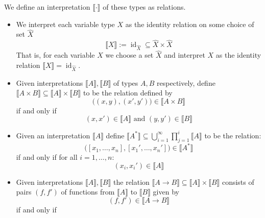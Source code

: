 \documentclass[12pt]{article}
\theoremstyle{plain}
\theoremstyle{definition}
\newcommand{\lto}{\longrightarrow}
\begin{document}
		We define an interpretation $\llbracket \cdot \rrbracket$ of these types as relations.
		\begin{itemize}
			\item We interpret each variable type $X$ as the identity relation on some choice of set $\hat{X}$
			\begin{equation}
				\llbracket X \rrbracket := \operatorname{id}_{\hat{X}} \subseteq \hat{X} \times \hat{X}
				\end{equation}
			That is, for each variable $X$ we choose a set $\hat{X}$ and interpret $X$ as the identity relation $\llbracket X \rrbracket = \operatorname{id}_{\hat{X}}$.
			\item Given interpretations $\llbracket A\rrbracket, \llbracket B \rrbracket$ of types $A,B$ respectively, define $\llbracket A \times B \rrbracket \subseteq \llbracket A \rrbracket \times \llbracket B \rrbracket$ to be the relation defined by
				\begin{equation*}
					\big((x,y), (x',y')\big) \in \llbracket A \times B \rrbracket
					\end{equation*}
				if and only if
				\begin{equation*}
				(x,x') \in \llbracket A \rrbracket\text{ and }(y,y') \in \llbracket B \rrbracket
				\end{equation*}
			\item Given an interpretation $\llbracket A \rrbracket$ define $\llbracket A^\ast \rrbracket \subseteq \bigcup_{i = 1}^\infty \prod_{j = 1}^i \llbracket A \rrbracket$ to be the relation:
			\begin{equation*}
				\big([x_1, \ldots, x_n], [x_1', \ldots, x_n']\big) \in \llbracket A^\ast \rrbracket
				\end{equation*}
			if and only if for all $i = 1, \ldots, n$:
				\begin{equation*}
					 (x_i, x_i') \in \llbracket A \rrbracket
				\end{equation*}
			\item Given interpretations $\llbracket A\rrbracket, \llbracket B \rrbracket$ the relation $\llbracket A \lto B \rrbracket \subseteq \llbracket A \rrbracket \times \llbracket B \rrbracket$ consists of pairs $(f,f')$ of functions from $\llbracket A \rrbracket$ to $\llbracket B \rrbracket$ given by
			\begin{equation*}
				(f,f') \in \llbracket A \lto B \rrbracket
				\end{equation*}
			if and only if
				\begin{equation*}

\end{equation*}
\end{itemize}
\end{document}
